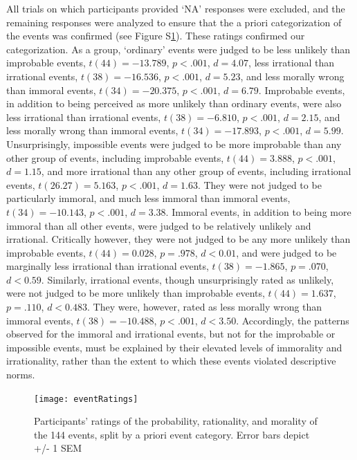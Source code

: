 \documentclass[11pt,letterpaper]{article}
\begin{document}
All trials on which participants provided `NA' responses were excluded, and the remaining responses were analyzed to ensure that the a priori categorization of the events was confirmed (see Figure S\ref{eventRatings}). These ratings confirmed our categorization. As a group, `ordinary' events were judged to be less unlikely than improbable events, $t(44)=-13.789$, $p<.001$, $d=4.07$, less irrational than irrational events, $t(38)=-16.536$, $p<.001$, $d=5.23$, and less morally wrong than immoral events, $t(34)=-20.375$, $p<.001$, $d=6.79$. Improbable events, in addition to being perceived as more unlikely than ordinary events, were also less irrational than irrational events, $t(38)=-6.810$, $p<.001$, $d=2.15$, and less morally wrong than immoral events, $t(34)=-17.893$, $p<.001$, $d=5.99$. Unsurprisingly, impossible events were judged to be more improbable than any other group of events, including improbable events, $t(44)=3.888$, $p<.001$, $d=1.15$, and more irrational than any other group of events, including irrational events, $t(26.27)=5.163$, $p<.001$, $d=1.63$. They were not judged to be particularly immoral, and much less immoral than immoral events, $t(34)=-10.143$, $p<.001$, $d=3.38$. Immoral events, in addition to being more immoral than all other events, were judged to be relatively unlikely and irrational. Critically however, they were not judged to be any more unlikely than improbable events, $t(44)=0.028$, $p=.978$, $d<0.01$, and were judged to be marginally less irrational than irrational events, $t(38)=-1.865$, $p=.070$, $d<0.59$. Similarly, irrational events, though unsurprisingly rated as unlikely, were not judged to be more unlikely than improbable events, $t(44)=1.637$, $p=.110$, $d<0.483$. They were, however, rated as less morally wrong than immoral events, $t(38)=-10.488$, $p<.001$, $d<3.50$. Accordingly, the patterns observed for the immoral and irrational events, but not for the improbable or impossible events, must be explained by their elevated levels of immorality and irrationality, rather than the extent to which these events violated descriptive norms.

\begin{figure}
    \centering
    \texttt{[image: eventRatings]}
    \caption{Participants' ratings of the probability, rationality, and morality of the 144 events, split by a priori event category. Error bars depict +/- 1 SEM}
    \label{eventRatings}
\end{figure}
\end{document}
